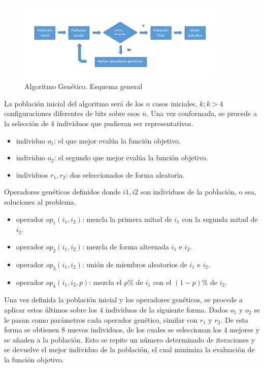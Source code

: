 \documentclass[a4paper,12pt]{book}
\begin{document}
		\begin{figure}[h]
			\centering
			\includegraphics[width=10cm]{./Graphics/GrafGen.png}
			\caption{Algoritmo Genético. Esquema general}
			\label{GrafGen}
		\end{figure}
		
		La población inicial del algoritmo será de los $n$ casos iniciales, $k; k > 4$ configuraciones diferentes de bits sobre esos $n$. Una vez conformada, se procede a la selección de $4$ individuos que pudieran ser representativos.
		
		\begin{itemize}
			\item individuo $o_1$: el que mejor evalúa la función objetivo.
			\item individuo $o_2$: el segundo que mejor evalúa la función objetivo.
			\item individuos $r_1, r_2$: dos seleccionados de forma aleatoria.
		\end{itemize} 
	
		Operadores genéticos definidos donde $i1, i2$ son individuos de la población, o sea, soluciones al problema.
		
			\begin{itemize}
			\item operador $op_1(i_1, i_2)$: mezcla la primera mitad de $i_1$ con la segunda mitad de $i_2$.
			\item operador $op_2(i_1, i_2)$: mezcla de forma alternada $i_1$ e $i_2$.
			\item operador $op_3(i_1, i_2)$: unión de miembros aleatorios de $i_1$ e $i_2$.
			\item operador $op_4(i_1, i_2, p)$: mezcla el $p\%$ de $i_1$ con el $(1-p)\%$ de $i_2$.
		\end{itemize}
	
		Una vez definida la población inicial y los operadores genéticos, se procede a aplicar estos últimos sobre los $4$ individuos de la siguiente forma. Dados $o_1$ y $o_2$ se le pasan como parámetros cada operador genético, similar con $r_1$ y $r_2$. De esta forma se obtienen $8$ nuevos individuos, de los cuales se seleccionan los $4$ mejores y se añaden a la población. Esto se repite un número determinado de iteraciones y se devuelve el mejor individuo de la población, el cual minimiza la evaluación de la función objetivo.
		
\end{document}
